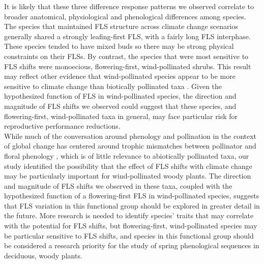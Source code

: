 \documentclass[11pt]{article}\usepackage[]{graphicx}\usepackage[]{color}
\begin{document}
{\noindent It is likely that these three difference response patterns we observed correlate to broader anatomical, physiological and phenological differences among species. The species that maintained FLS structure across climate change scenarios generally shared a strongly leafing-first FLS, with a fairly long FLS interphase. These species tended to have mixed buds so there may be strong physical constraints on their FLSs. By contrast, the species that were most sensitive to FLS shifts were monoecious, flowering-first, wind-pollinated shrubs. This result may reflect other evidence that wind-pollinated species appear to be more sensitive to climate change than biotically pollinated taxa \citep{Ziello:2012aa}. Given the hypothesized function of FLS in wind-pollinated species, the direction and magnitude of FLS shifts we observed could suggest that these species, and flowering-first, wind-pollinated taxa in general, may face particular risk for reproductive performance reductions.\\

\noindent While much of the conversation around phenology and pollination in the context of global change has centered around trophic mismatches between pollinator and floral phenology \citep{Memmott2007}, which is of little relevance to abiotically pollinated taxa, our study identified the possibility that the effect of FLS shifts with climate change may be particularly important for wind-pollinated woody plants. The direction and magnitude of FLS shifts we observed in these taxa, coupled with the hypothesized function of a flowering-first FLS in wind-pollinated species, suggests that FLS variation in this functional group should be explored in greater detail in the future. More research is needed to identify species' traits that may correlate with the potential for FLS shifts, but flowering-first, wind-pollinated species may be particular sensitive to FLS shifts, and species in this functional group should be considered a research priority for the study of spring phenological sequences in deciduous, woody plants.\\ 


 
}
\end{document}

